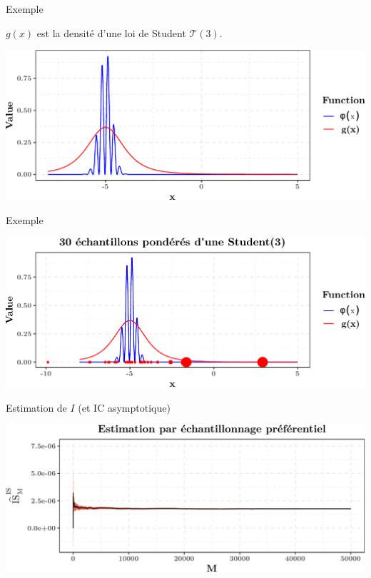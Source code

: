 \documentclass[ignorenonframetext,]{beamer}
\begin{document}
\begin{frame}{Exemple}
\protect\hypertarget{exemple}{}

\(g(x)\) est la densité d'une loi de Student \(\mathcal{T}(3)\).

\includegraphics{diapos_importance_sampling_files/figure-beamer/main_plot_is-1.pdf}

\end{frame}

\begin{frame}{Exemple}
\protect\hypertarget{exemple-1}{}

\includegraphics{diapos_importance_sampling_files/figure-beamer/plot_is_estimate_example-1.pdf}

\end{frame}

\begin{frame}{Estimation de \(I\) (et IC asymptotique)}
\protect\hypertarget{estimation-de-i-et-ic-asymptotique}{}

\includegraphics{diapos_importance_sampling_files/figure-beamer/plot_is_estimate-1.pdf}

\end{frame}
\end{document}
